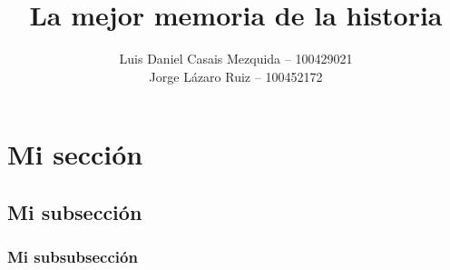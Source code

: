 \documentclass[es]{uc3mreport}
\author{
    Luis Daniel Casais Mezquida -- 100429021\\
    Jorge Lázaro Ruiz -- 100452172
}
\title{La mejor memoria de la historia}
\begin{document}
    \makecover

    \tableofcontents


    \section{Mi sección}
    \lipsum[1]

    \subsection{Mi subsección}
    \lipsum[2-4]

    \subsubsection{Mi subsubsección}
    \lipsum[2-4]
\end{document}
